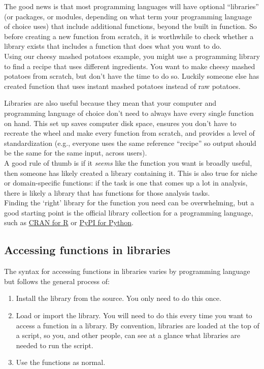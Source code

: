 \documentclass[
]{book}
\providecommand{\tightlist}{%
  \setlength{\itemsep}{0pt}\setlength{\parskip}{0pt}}
\begin{document}
The good news is that most programming languages will have optional ``libraries'' (or packages, or modules, depending on what term your programming language of choice uses) that include additional functions, beyond the built in function. So before creating a new function from scratch, it is worthwhile to check whether a library exists that includes a function that does what you want to do.\\

Using our cheesy mashed potatoes example, you might use a programming library to find a recipe that uses different ingredients. You want to make cheesy mashed potatoes from scratch, but don't have the time to do so. Luckily someone else has created function that uses instant mashed potatoes instead of raw potatoes.

Libraries are also useful because they mean that your computer and programming language of choice don't need to always have every single function on hand. This set up saves computer disk space, ensures you don't have to recreate the wheel and make every function from scratch, and provides a level of standardization (e.g., everyone uses the same reference ``recipe'' so output should be the same for the same input, across users).\\

A good rule of thumb is if it \emph{seems} like the function you want is broadly useful, then someone has likely created a library containing it. This is also true for niche or domain-specific functions: if the task is one that comes up a lot in analysis, there is likely a library that has functions for those analysis tasks.\\

Finding the `right' library for the function you need can be overwhelming, but a good starting point is the official library collection for a programming language, such as \href{https://cran.r-project.org/web/views/}{CRAN for R} or \href{https://pypi.org/}{PyPI for Python}.

\subsection{Accessing functions in libraries}\label{accessing-functions-in-libraries}

The syntax for accessing functions in libraries varies by programming language but follows the general process of:

\begin{enumerate}
\def\labelenumi{\arabic{enumi}.}
\tightlist
\item
  Install the library from the source. You only need to do this once.
\item
  Load or import the library. You will need to do this every time you want to access a function in a library. By convention, libraries are loaded at the top of a script, so you, and other people, can see at a glance what libraries are needed to run the script.
\item
  Use the functions as normal.
\end{enumerate}
\end{document}
